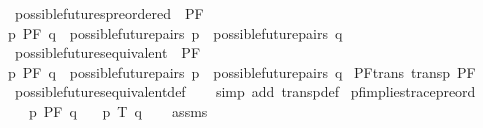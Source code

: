 \begin{isabellebody}
\isanewline
{}\isamarkupfalse%
\ possible{\isacharunderscore}{\kern0pt}futures{\isacharunderscore}{\kern0pt}preordered\ {\isacharparenleft}{\kern0pt}\ {\isacartoucheopen}{\isasymlesssim}PF{\isacartoucheclose}\ {}{}{\isacharparenright}{\kern0pt}\ \isanewline
{\isacartoucheopen}p\ {\isasymlesssim}PF\ q\ {\isasymequiv}\ {\isacharparenleft}{\kern0pt}possible{\isacharunderscore}{\kern0pt}future{\isacharunderscore}{\kern0pt}pairs\ p\ {\isasymsubseteq}\ possible{\isacharunderscore}{\kern0pt}future{\isacharunderscore}{\kern0pt}pairs\ q{\isacharparenright}{\kern0pt}{\isacartoucheclose}\isanewline
\isanewline
{}\isamarkupfalse%
\ possible{\isacharunderscore}{\kern0pt}futures{\isacharunderscore}{\kern0pt}equivalent\ {\isacharparenleft}{\kern0pt}\ {\isacartoucheopen}{\isasymsimeq}PF{\isacartoucheclose}\ {}{}{\isacharparenright}{\kern0pt}\ \isanewline
{\isacartoucheopen}p\ {\isasymsimeq}PF\ q\ {\isasymequiv}\ {\isacharparenleft}{\kern0pt}possible{\isacharunderscore}{\kern0pt}future{\isacharunderscore}{\kern0pt}pairs\ p\ {\isacharequal}{\kern0pt}\ possible{\isacharunderscore}{\kern0pt}future{\isacharunderscore}{\kern0pt}pairs\ q{\isacharparenright}{\kern0pt}{\isacartoucheclose}\isanewline
\isanewline
{}\isamarkupfalse%
\ PF{\isacharunderscore}{\kern0pt}trans{\isacharcolon}{\kern0pt}\ {\isachardoublequoteopen}transp\ {\isacharparenleft}{\kern0pt}{\isasymsimeq}PF{\isacharparenright}{\kern0pt}{\isachardoublequoteclose}\isanewline
%
\isadelimproof
\ \ %
\endisadelimproof
%
\isatagproof
{}\isamarkupfalse%
\ possible{\isacharunderscore}{\kern0pt}futures{\isacharunderscore}{\kern0pt}equivalent{\isacharunderscore}{\kern0pt}def\isanewline
\ \ \isamarkupfalse%
\ {\isacharparenleft}{\kern0pt}simp\ add{\isacharcolon}{\kern0pt}\ transp{\isacharunderscore}{\kern0pt}def{\isacharparenright}{\kern0pt}%
\endisatagproof
{\isafoldproof}%
%
\isadelimproof
\isanewline
%
\endisadelimproof
\isanewline
{}\isamarkupfalse%
\ pf{\isacharunderscore}{\kern0pt}implies{\isacharunderscore}{\kern0pt}trace{\isacharunderscore}{\kern0pt}preord{\isacharcolon}{\kern0pt}\isanewline
\ \ \ {\isacartoucheopen}p\ {\isasymlesssim}PF\ q{\isacartoucheclose}\isanewline
\ \ \ {\isacartoucheopen}p\ {\isasymlesssim}T\ q{\isacartoucheclose}\isanewline
%
\isadelimproof
\ \ %
\endisadelimproof
%
\isatagproof
{}\isamarkupfalse%
\ assms\ \isamarkupfalse%

\end{isabellebody}

